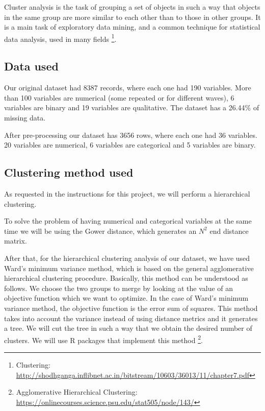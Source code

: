 

Cluster analysis is \guillemotleft the task of grouping a set of objects in such a way that objects in the same group are more similar to each other than to those in other groups. It is a main task of exploratory data mining, and a common technique for statistical data analysis, used in many fields \guillemotright \footnote{Clustering: \url{http://shodhganga.inflibnet.ac.in/bitstream/10603/36013/11/chapter7.pdf}}.

\subsection{Data used}

Our original dataset had 8387 records, where each one had 190 variables. More than 100 variables are numerical (some repeated or for different waves), 6 variables are binary and 19 variables are qualitative. The dataset has a 26.44\% of missing data.

After pre-processing our dataset has 3656 rows, where each one had 36 variables. 20 variables are numerical, 6 variables are categorical and 5 variables are binary.

\subsection{Clustering method used}
As requested in the instructions for this project, we will perform a hierarchical clustering.

To solve the problem of having numerical and categorical variables at the same time we will be using the Gower distance, which generates an $N^2$ {end} distance matrix.

After that, for the hierarchical clustering analysis of our dataset, we have used Ward's minimum variance method, which is based on the general agglomerative hierarchical clustering procedure. Basically, this method can be understood as follows. We choose the two groups to merge by looking at the value of an objective function which we want to optimize. In the case of Ward's minimum variance method, the objective function is the error sum of squares. This method takes into account the variance instead of using distance metrics and it generates a tree. We will cut the tree in such a way that we obtain the desired number of clusters. We will use R packages that implement this method \footnote{Agglomerative Hierarchical Clustering: \url{https://onlinecourses.science.psu.edu/stat505/node/143/}}.



